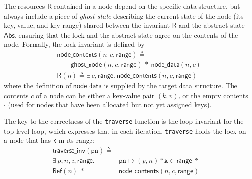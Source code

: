 \documentclass[sigplan,10pt,anonymous,review]{acmart}\settopmatter{printfolios=true,printccs=false,printacmref=false}
\newcommand{\treerep}{\ensuremath{\mathsf{Abs}}}
\newcommand{\nodeboxrep}{\ensuremath{\mathsf{Ref }}}
\begin{document}
The resources $\mathsf{R}$ contained in a node depend on the specific data structure, but always include a piece of \emph{ghost state} describing the current state of the node (its key, value, and key range) shared between the invariant $\mathsf{R}$ and the abstract state $\treerep$, ensuring that the lock and the abstract state agree on the contents of the node. Formally, the lock invariant is defined by 
\begin{align*}&\mathsf{node\_contents}(n, c, \mathsf{range}) \triangleq \\ 
	&\qquad\mathsf{ghost\_node}(n, c,\mathsf{range}) \ \ast \ \mathsf{node\_data}(n, c) \\
	&\mathsf{R}(n) \triangleq \exists\ c, \mathsf{range}.\ \mathsf{node\_contents}(n, c, \mathsf{range})\end{align*}
where the definition of $\mathsf{node\_data}$ is supplied by the target data structure. The contents $c$ of a node can be either a key-value pair $(k, v)$, or the empty contents $\cdot$ (used for nodes that have been allocated but not yet assigned keys).



The key to the correctness of the \texttt{traverse} function is the loop invariant for the top-level loop, which expresses that in each iteration, \lstinline{traverse} holds the lock on a node that has \lstinline{k} in its range:
\begin{align*}\mathsf{traverse\_inv}(\texttt{pn}) \triangleq \\ \exists \ p, n, c, \mathsf{range}.\ &\texttt{pn} \mapsto (p, n) \ast \texttt{k} \in \mathsf{range}\ \ast \ \\  \nodeboxrep(n)  \ \ast \  &\mathsf{node\_contents}(n, c, \mathsf{range})
\end{align*}
\end{document}
